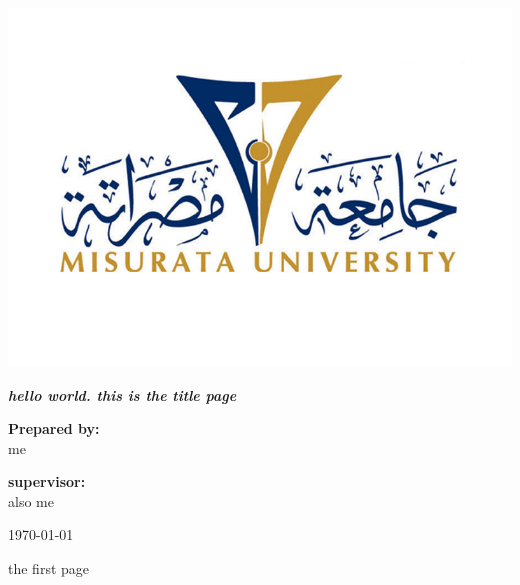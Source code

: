 \documentclass[11pt]{article}
\begin{document}
\begin{titlepage}
    \titlefont
    \center
    \includegraphics{images/logo2.png}
    \vspace{0.5in}

    \begin{huge}
        \itshape
        \bfseries
        hello world. this is the title page
    \end{huge}

    \vspace{0.5in}

    \textbf{Prepared by:}\\
    me

    \vspace{0.5in}
    \textbf{supervisor:}\\
    also me

    \vspace{0.5in}
    \today
\end{titlepage}

the first page
\end{document}
